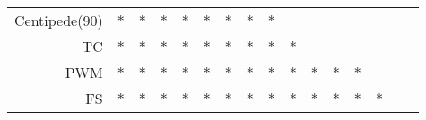 \documentclass[landscape, 6pt]{report}
\begin{document}
\begin{table}[h!]
\begin{center}
\begin{tabular}{ rccccccccccccccc }
    Centipede(90) & $*$ & $*$ & $*$ & $*$ & $*$ & $*$ & $*$ & $*$ &     &     &     &     &     &     &     \\
    TC & $*$ & $*$ & $*$ & $*$ & $*$ & $*$ & $*$ & $*$ & $*$ &     &     &     &     &     &     \\
    PWM & $*$ & $*$ & $*$ & $*$ & $*$ & $*$ & $*$ & $*$ & $*$ & $*$ & $*$ & $*$ &     &     &     \\
    FS & $*$ & $*$ & $*$ & $*$ & $*$ & $*$ & $*$ & $*$ & $*$ & $*$ & $*$ & $*$ & $*$ &     &     \\
    \hline
  \end{tabular}
\end{center}
\vspace{0.0cm}
\end{table}
\end{document}
